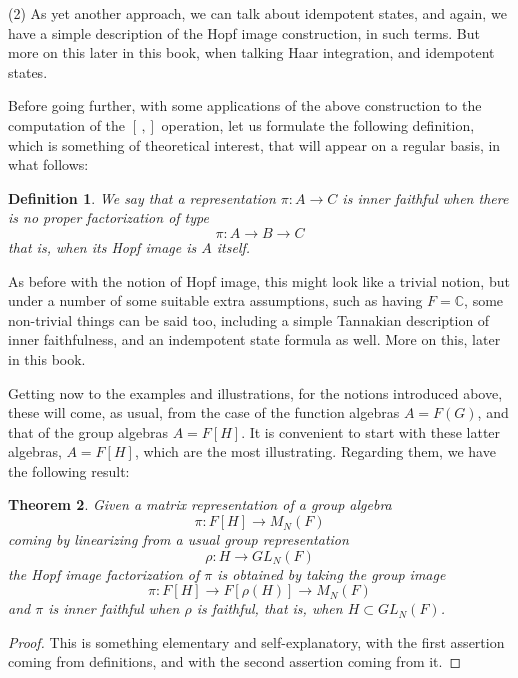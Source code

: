 \documentclass[12pt]{amsbook}
\newtheorem{theorem}{Theorem}[chapter]
\newtheorem{definition}[theorem]{Definition}
\begin{document}
\bigskip

(2) As yet another approach, we can talk about idempotent states, and again, we have a simple description of the Hopf image construction, in such terms. But more on this later in this book, when talking Haar integration, and idempotent states. 

\bigskip

Before going further, with some applications of the above construction to the computation of the $[\,,]$ operation, let us formulate the following definition, which is something of theoretical interest, that will appear on a regular basis, in what follows:


\begin{definition}
We say that a representation $\pi:A\to C$ is inner faithful when there is no proper factorization of type
$$\pi:A\to B\to C$$
that is, when its Hopf image is $A$ itself.
\end{definition}

As before with the notion of Hopf image, this might look like a trivial notion, but under a number of  some suitable extra assumptions, such as having $F=\mathbb C$, some non-trivial things can be said too, including a simple Tannakian description of inner faithfulness, and an indempotent state formula as well. More on this, later in this book.

\bigskip

Getting now to the examples and illustrations, for the notions introduced above, these will come, as usual, from the case of the function algebras $A=F(G)$, and that of the group algebras $A=F[H]$. It is convenient to start with these latter algebras, $A=F[H]$, which are the most illustrating. Regarding them, we have the following result:

\begin{theorem}
Given a matrix representation of a group algebra
$$\pi:F[H]\to M_N(F)$$
coming by linearizing from a usual group representation
$$\rho:H\to GL_N(F)$$
the Hopf image factorization of $\pi$ is obtained by taking the group image
$$\pi:F[H]\to F[\rho(H)]\to M_N(F)$$
and $\pi$ is inner faithful when $\rho$ is faithful, that is, when $H\subset GL_N(F)$. 
\end{theorem}

\begin{proof}
This is something elementary and self-explanatory, with the first assertion coming from definitions, and with the second assertion coming from it.
\end{proof}
\end{document}
